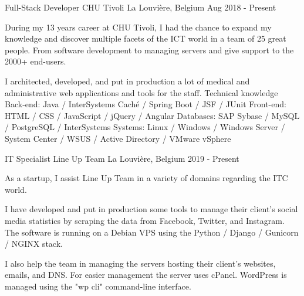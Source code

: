 

\begin{cventries}

  \cventry
    {Full-Stack Developer} %
    {CHU Tivoli} %
    {La Louvière, Belgium} %
    {Aug 2018 - Present} %
    {
During my 13 years career at CHU Tivoli, I had the chance to expand my knowledge and discover multiple facets of the ICT world in a team of 25  great people. From software development to managing servers and give support to the 2000+ end-users.
    
I architected, developed, and put in production a lot of medical and administrative web applications and tools for the staff.
    \linebreak \newline
Technical knowledge\linebreak
Back-end: Java / InterSystems Caché / Spring Boot / JSF / JUnit \linebreak
Front-end: HTML / CSS / JavaScript / jQuery / Angular \linebreak
Databases: SAP Sybase / MySQL / PostgreSQL / InterSystems \linebreak
Systems: Linux / Windows / Windows Server / System Center / WSUS / Active Directory / VMware vSphere

    }

  \cventry
    {IT Specialist} %
    {Line Up Team} %
    {La Louvière, Belgium} %
    {2019 - Present} %
    {
As a startup, I assist Line Up Team in a variety of domains regarding the ITC world.

I have developed and put in production some tools to manage their client's social media statistics by scraping the data from Facebook, Twitter, and Instagram. The software is running on a Debian VPS using the Python / Django / Gunicorn / NGINX stack.

I also help the team in managing the servers hosting their client's websites, emails, and DNS. For easier management the server uses cPanel. WordPress is managed using the "wp cli" command-line interface.

}
\end{cventries}
